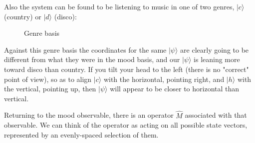 Also the system can be found to be listening to music in one of two genres, $|c\rangle$ (country) or $|d\rangle$ (disco):

\begin{figure}[h]
  \centering
  \centering
  \caption{Genre basis} \label{fig:genre-basis}
\end{figure}

Against this genre basis the coordinates for the same $|\psi\rangle$ are clearly going to be different from what they were in the mood basis, and our $|\psi\rangle$ is leaning more toward disco than country. If you tilt your head to the left (there is no "correct" point of view), so as to align $|c\rangle$ with the horizontal, pointing right, and $|h\rangle$ with the vertical, pointing up, then $|\psi\rangle$ will appear to be closer to horizontal than vertical.

Returning to the mood observable, there is an operator $\hat{M}$ associated with that observable. We can think of the operator as acting on all possible state vectors, represented by an evenly-spaced selection of them.

